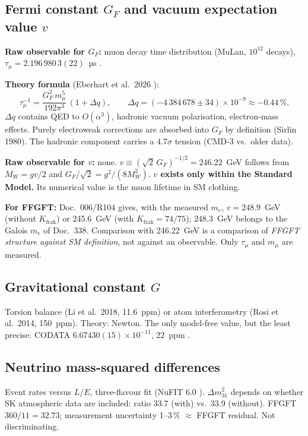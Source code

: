 \subsection{Fermi constant $G_F$ and vacuum expectation value $v$}

\textbf{Raw observable for $G_F$:} muon decay time distribution (MuLan, $10^{12}$ decays), $\tau_\mu=2.196\,980\,3(22)$~µs \QM.

\textbf{Theory formula} (Eberhart et al.\ 2026 \QM):
\begin{equation}
\tau_\mu^{-1}=\frac{G_F^2\,m_\mu^5}{192\pi^3}\,(1+\Delta q),\qquad \Delta q=(-4\,384\,678\pm34)\times10^{-9}\approx-0.44\,\%.
\end{equation}
$\Delta q$ contains QED to $O(\alpha^3)$, hadronic vacuum polarisation, electron-mass effects. Purely electroweak corrections are absorbed into $G_F$ by definition (Sirlin 1980). The hadronic component carries a $4.7\sigma$ tension (CMD-3 vs.\ older data).

\textbf{Raw observable for $v$:} none. $v\equiv(\sqrt2\,G_F)^{-1/2}=246.22$~GeV follows from $M_W=gv/2$ and $G_F/\sqrt2=g^2/(8M_W^2)$. \textbf{$v$ exists only within the Standard Model.} Its numerical value is the muon lifetime in SM clothing.

\textbf{For FFGFT:} Doc.~006/R104 gives, with the measured $m_e$, $v=248.9$~GeV (without $K_\text{frak}$) or 245.6~GeV (with $K_\text{frak}=74/75$); $248.3$~GeV belongs to the Galois $m_e$ of Doc.~338. Comparison with 246.22~GeV is a comparison of \emph{FFGFT structure against SM definition}, not against an observable. Only $\tau_\mu$ and $m_\mu$ are measured.

\subsection{Gravitational constant $G$}

Torsion balance (Li et al.\ 2018, 11.6~ppm) or atom interferometry (Rosi et al.\ 2014, 150~ppm). Theory: Newton. The only model-free value, but the least precise: CODATA $6.67430(15)\times10^{-11}$, 22~ppm \QM.

\subsection{Neutrino mass-squared differences}

Event rates versus $L/E$, three-flavour fit (NuFIT 6.0 \QM). $\Delta m^2_{31}$ depends on whether SK atmospheric data are included: ratio 33.7 (with) vs.\ 33.9 (without). FFGFT $360/11=32.73$; measurement uncertainty 1--3\,\% $\approx$ FFGFT residual. Not discriminating.

